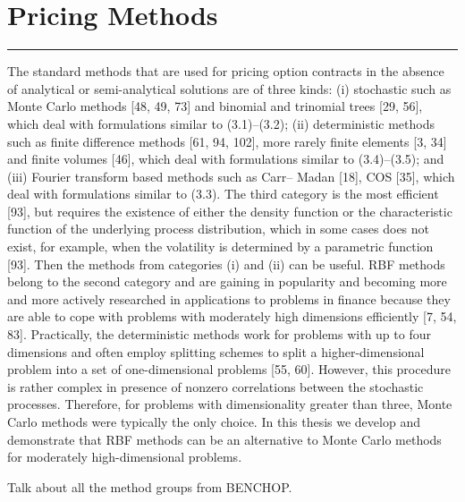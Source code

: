 \documentclass{UUThesisTemplate}
\begin{document}
\section{Pricing Methods}
\label{sec:methods}
\par
\par \noindent \color{red}\rule{\textwidth}{2pt}
The standard methods that are used for pricing option contracts in the absence of analytical or semi-analytical solutions are of three kinds: (i) stochastic such as Monte Carlo methods [48, 49, 73] and binomial and trinomial trees [29, 56], which deal with formulations similar to (3.1)–(3.2); (ii) deterministic methods such as finite difference methods [61, 94, 102], more rarely finite elements [3, 34] and finite volumes [46], which deal with formulations similar to (3.4)–(3.5); and (iii) Fourier transform based methods such as Carr– Madan [18], COS [35], which deal with formulations similar to (3.3). The third category is the most efficient [93], but requires the existence of either the density function or the characteristic function of the underlying process distribution, which in some cases does not exist, for example, when the volatility is determined by a parametric function [93]. Then the methods from categories (i) and (ii) can be useful. RBF methods belong to the second category and are gaining in popularity and becoming more and more actively researched in applications to problems in finance because they are able to cope with problems with moderately high dimensions efficiently [7, 54, 83].
Practically, the deterministic methods work for problems with up to four dimensions and often employ splitting schemes to split a higher-dimensional problem into a set of one-dimensional problems [55, 60]. However, this procedure is rather complex in presence of nonzero correlations between the stochastic processes. Therefore, for problems with dimensionality greater than three, Monte Carlo methods were typically the only choice. In this thesis we develop and demonstrate that RBF methods can be an alternative to Monte Carlo methods for moderately high-dimensional problems.



Talk about all the method groups from BENCHOP.
%
%
\end{document}
